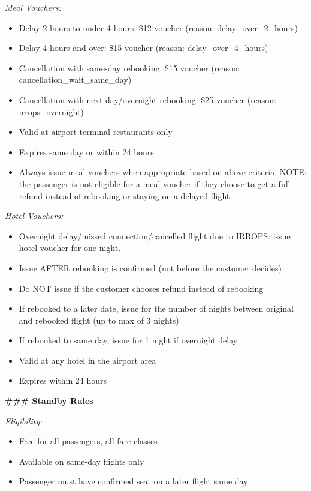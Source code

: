 \begin{tcolorbox}[promptbox, title={\small \texttt{Airline CSM Agent Prompt}}]
\medskip
\textit{Meal Vouchers:}
\begin{itemize}
  \item Delay 2 hours to under 4 hours: \$12 voucher (reason: delay\_over\_2\_hours)
  \item Delay 4 hours and over: \$15 voucher (reason: delay\_over\_4\_hours)
  \item Cancellation with same-day rebooking: \$15 voucher (reason:
        cancellation\_wait\_same\_day)
  \item Cancellation with next-day/overnight rebooking: \$25 voucher (reason:
        irrops\_overnight)
  \item Valid at airport terminal restaurants only
  \item Expires same day or within 24 hours
  \item Always issue meal vouchers when appropriate based on above criteria. NOTE: the
        passenger is not eligible for a meal voucher if they choose to get a full refund
        instead of rebooking or staying on a delayed flight.
\end{itemize}
 
\medskip
\textit{Hotel Vouchers:}
\begin{itemize}
  \item Overnight delay/missed connection/cancelled flight due to IRROPS: issue hotel
        voucher for one night.
  \item Issue AFTER rebooking is confirmed (not before the customer decides)
  \item Do NOT issue if the customer chooses refund instead of rebooking
  \item If rebooked to a later date, issue for the number of nights between original and
        rebooked flight (up to max of 3 nights)
  \item If rebooked to same day, issue for 1 night if overnight delay
  \item Valid at any hotel in the airport area
  \item Expires within 24 hours
\end{itemize}
 
\bigskip
\textbf{\#\#\# Standby Rules}
 
\medskip
\textit{Eligibility:}
\begin{itemize}
  \item Free for all passengers, all fare classes
  \item Available on same-day flights only
  \item Passenger must have confirmed seat on a later flight same day
\end{itemize}
 

\end{tcolorbox}
